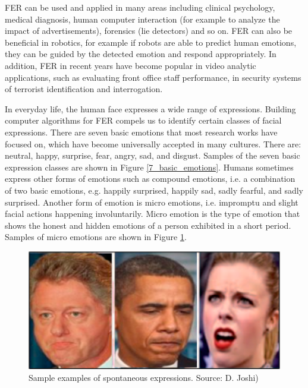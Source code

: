 \documentclass[master]{thesis-uestc}
\begin{document}
FER can be used and applied in many areas including clinical psychology, medical diagnosis, human computer interaction (for example to analyze the impact of advertisements), forensics (lie detectors) and so on. FER can also be beneficial in robotics, for example if robots are able to predict human emotions, they can be guided by the detected emotion and respond appropriately. In addition, FER in recent years have become popular in video analytic applications, such as evaluating front office staff performance, in security systems of terrorist identification and interrogation.

In everyday life, the human face expresses a wide range of expressions. Building computer algorithms for FER compels us to identify certain classes of facial expressions. There are seven basic emotions that most research works have focused on, which have become universally accepted in many cultures. There are: neutral, happy, surprise, fear, angry, sad, and disgust. Samples of the seven basic expression classes are shown in Figure \ref{7_basic_emotions}. Humans sometimes express other forms of emotions such as compound emotions, i.e. a combination of two basic emotions, e.g. happily surprised, happily sad, sadly fearful, and sadly surprised. Another form of emotion is micro emotions, i.e. impromptu and slight facial actions happening involuntarily. Micro emotion is the type of emotion that shows the honest and hidden emotions of a person exhibited in a short period. Samples of micro emotions are shown in Figure \ref{micro_emotions}.

\begin{figure}[ht]
\includegraphics[width=5in]{pic/micro_expressions.png}
\caption{Sample examples of spontaneous expressions. Source: D. Joshi)}
\label{micro_emotions}
\end{figure}
\end{document}
